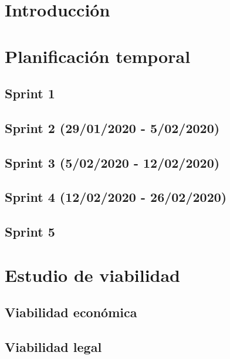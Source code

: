 
\section{Introducción}

\section{Planificación temporal}
\subsection{Sprint 1}
\subsection{Sprint 2 (29/01/2020 - 5/02/2020)}
\subsection{Sprint 3 (5/02/2020 - 12/02/2020)}
\subsection{Sprint 4 (12/02/2020 - 26/02/2020)}
\subsection{Sprint 5}

\section{Estudio de viabilidad}

\subsection{Viabilidad económica}

\subsection{Viabilidad legal}


